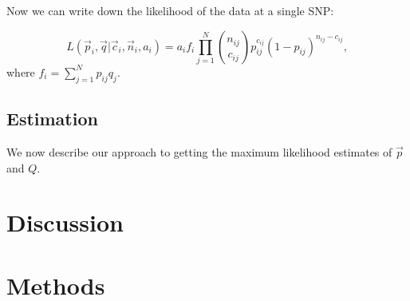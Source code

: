 \documentclass[11pt,titlepage]{article}
\begin{document}
Now we can write down the likelihood of the data at a single SNP:

\begin{equation}
L(\vec p_i, \vec q | \vec c_i, \vec n_i, a_i) = a_i f_i \prod  \limits_{j = 1}^N {n_{ij} \choose c_{ij}} p_{ij}^{c_{ij}} (1-p_{ij})^{n_{ij}- c_{ij}} , 
\end{equation}
\noindent where $f_i = \sum \limits_{j = 1}^{N} p_{ij} q_j$.  

\subsection{Estimation}
We now describe our approach to getting the maximum likelihood estimates of $\vec p$ and $Q$. 

\section{Discussion}

\section{Methods}

\end{document}
